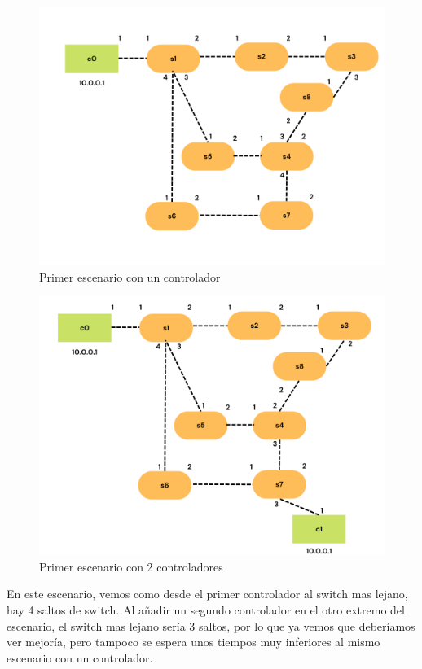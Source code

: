 \documentclass[a4paper, 12pt]{book}
\begin{document}
 	\vspace*{-18pt}
 	\begin{figure}[H]
 		\centering
 		\includegraphics[width=12cm, keepaspectratio]{img/escenario1-1}
 		\caption{Primer escenario con un controlador}
 		\label{figura:escenario1-1c}
 	\end{figure}
 	
 	\begin{figure}[H]
 		\centering
 		\includegraphics[width=12cm, keepaspectratio]{img/escenario1-2}
 		\caption{Primer escenario con 2 controladores}
 		\label{figura:escenario1-2c}
 		\vspace{-18pt}
 	\end{figure}
 	
 	En este escenario, vemos como desde el primer controlador al switch mas lejano, hay 4 saltos de switch. Al añadir un segundo controlador en el otro extremo del escenario, el switch mas lejano sería 3 saltos, por lo que ya vemos que deberíamos ver mejoría, pero tampoco se espera unos tiempos muy inferiores al mismo escenario con un controlador.
 	
\end{document}

